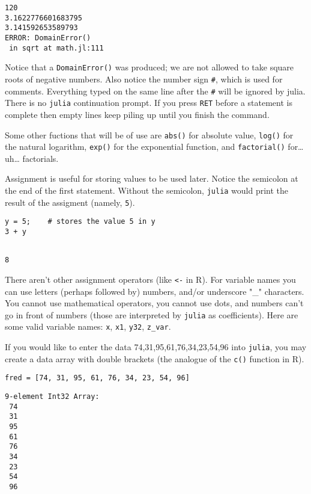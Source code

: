 \documentclass[11pt]{article}
\begin{document}
\begin{verbatim}
120
3.1622776601683795
3.141592653589793
ERROR: DomainError()
 in sqrt at math.jl:111
\end{verbatim}

Notice that a \texttt{DomainError()} was produced; we are not allowed to take
square roots of negative numbers. Also notice the number sign \texttt{\#},
which is used for comments. Everything typed on the same line after
the \texttt{\#} will be ignored by julia. There is no \texttt{julia} continuation
prompt. If you press \texttt{RET} before a statement is complete then empty
lines keep piling up until you finish the command.

Some other fuctions that will be of use are \texttt{abs()} for absolute
value, \texttt{log()} for the natural logarithm, \texttt{exp()} for the exponential
function, and \texttt{factorial()} for\ldots{} uh\ldots{} factorials.

Assignment is useful for storing values to be used later. Notice the
semicolon at the end of the first statement.  Without the semicolon,
\texttt{julia} would print the result of the assigment (namely, \texttt{5}).

\begin{verbatim}
y = 5;    # stores the value 5 in y
3 + y
\end{verbatim}

\begin{verbatim}

8
\end{verbatim}

There aren't other assignment operators (like \texttt{<-} in R).  For
variable names you can use letters (perhaps followed by) numbers,
and/or underscore "\_" characters. You cannot use mathematical
operators, you cannot use dots, and numbers can't go in front of
numbers (those are interpreted by \texttt{julia} as coefficients). Here are
some valid variable names: \texttt{x}, \texttt{x1}, \texttt{y32}, \texttt{z\_var}.

If you would like to enter the data 74,31,95,61,76,34,23,54,96 into
\texttt{julia}, you may create a data array with double brackets (the analogue
of the \texttt{c()} function in R).

\begin{verbatim}
fred = [74, 31, 95, 61, 76, 34, 23, 54, 96]
\end{verbatim}

\begin{verbatim}
9-element Int32 Array:
 74
 31
 95
 61
 76
 34
 23
 54
 96
\end{verbatim}
\end{document}
